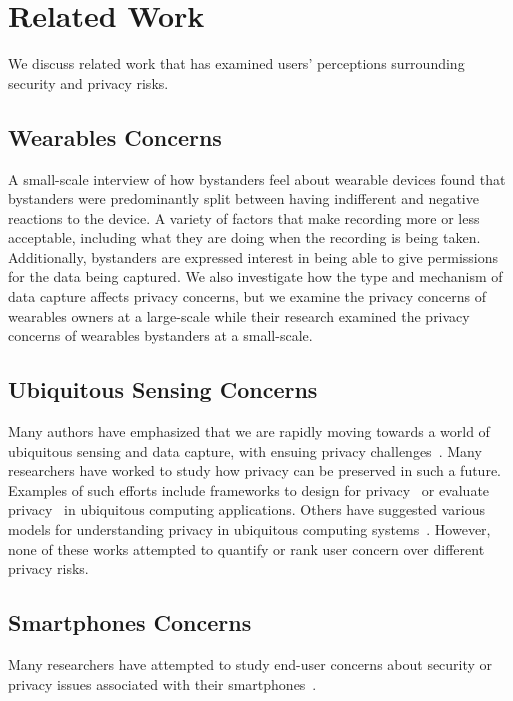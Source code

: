 
\section{Related Work}
We discuss related work that has examined users' perceptions surrounding security and privacy risks.

\subsection{Wearables Concerns}
A small-scale interview of how bystanders feel about wearable devices \cite{denning2014situ} found that bystanders were predominantly split between having indifferent and negative reactions to the device. A variety of factors that make recording more or less acceptable, including what they are doing when the recording is being taken.  Additionally, bystanders are expressed interest in being able to give permissions for the data being captured. We also investigate how the type and mechanism of data capture affects privacy concerns, but we examine the privacy concerns of wearables owners at a large-scale while their research examined the privacy concerns of wearables bystanders at a small-scale. 

\subsection{Ubiquitous Sensing Concerns}
Many authors have emphasized that we are rapidly moving towards a world of ubiquitous sensing and data capture, with ensuing privacy challenges~\cite{abowd2000charting,palen2003unpacking,camp2000internet}. Many researchers have worked to study how privacy can be preserved in such a future. Examples of such efforts include frameworks to design for privacy~\cite{bellotti1993design,camp2003designing,langheinrich2001privacy} or evaluate privacy~\cite{scholtz2004toward} in ubiquitous computing applications. Others have suggested various models for understanding privacy in ubiquitous computing systems~\cite{hong2004privacy, jiang2002approximate}. However, none of these works attempted to quantify or rank user concern over different privacy risks. 

\subsection{Smartphones Concerns}
Many researchers have attempted to study end-user concerns about security or privacy issues associated with their smartphones~\cite{chin2012measuring, palen2000going, felt2012android}.  

